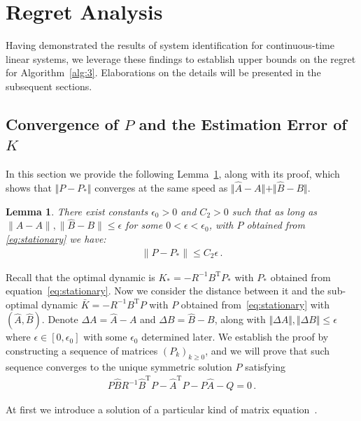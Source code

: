 \documentclass{article}
\newtheorem{lemma}[theorem]{Lemma}
\theoremstyle{definition}
\begin{document}
\section{Regret Analysis}
\label{app:B}
Having demonstrated the results of system identification for continuous-time linear systems, we leverage these findings to establish upper bounds on the regret for Algorithm~\ref{alg:3}. Elaborations on the details will be presented in the subsequent sections.

\subsection{Convergence of $P$ and the Estimation Error of $K$}
In this section we provide the following Lemma~\ref{lem:convergence of P}, along with its proof, which shows that $\Vert P-P_{*}\Vert$ converges at the same speed as $\Vert \hat{A}-A\Vert+\Vert \hat{B}-B\Vert$.

\begin{lemma}\label{lem:convergence of P}
	There exist constants $\epsilon_{0}>0$ and $C_{2}>0$ such that as long as $\|\hat{A}-A\|,\|\hat{B}-B\|\leq \epsilon$ for some $0<\epsilon<\epsilon_{0}$, with $P$ obtained from \eqref{eq:stationary} we have:
	\begin{align}
	\|P-P_{*}\|\leq C_{2}\epsilon\,.
	\end{align}	
\end{lemma}

Recall that the optimal dynamic is $K_{*}=-R^{-1}B^{\mathrm{T}}P_{*}$ with $P_{*}$ obtained from equation~\eqref{eq:stationary}. Now we consider the distance between it and the sub-optimal dynamic $\bar{K}=-R^{-1}B^{\mathrm{T}}P$ with $P$ obtained from~\eqref{eq:stationary} with $(\hat{A},\hat{B})$. Denote $\Delta A=\hat{A}-A$ and $\Delta B=\hat{B}-B$, along with $\Vert \Delta A\Vert ,\Vert \Delta B\Vert \leq \epsilon$ where $\epsilon\in[0,\epsilon_{0}]$ with some $\epsilon_{0}$ determined later.
We establish the proof by constructing a sequence of matrices $(P_{k})_{k\geq 0}$, and we will prove that such sequence converges to the unique symmetric solution $P$ satisfying 
\begin{align*}
P\hat{B}R^{-1}\hat{B}^{\mathrm{T}}P-\hat{A}^{\mathrm{T}}P-P\hat{A}-Q=0\,. 
\end{align*}


At first we introduce a solution of a particular kind of matrix equation~\citep{kleinman1968iterative}.
\end{document}
